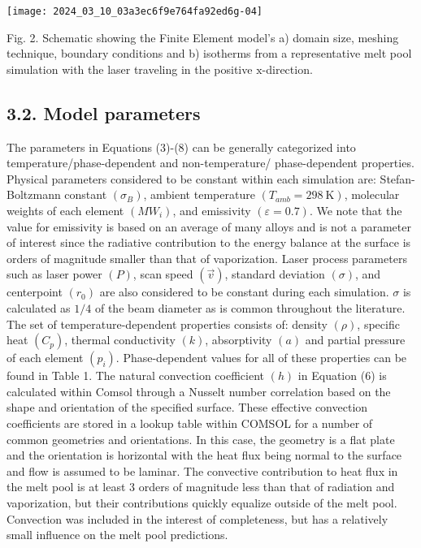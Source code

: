 \documentclass[10pt]{article}
\begin{document}
\begin{center}
\texttt{[image: 2024\_03\_10\_03a3ec6f9e764fa92ed6g-04]}
\end{center}

Fig. 2. Schematic showing the Finite Element model's a) domain size, meshing technique, boundary conditions and b) isotherms from a representative melt pool simulation with the laser traveling in the positive $\mathrm{x}$-direction.

\subsection*{3.2. Model parameters}
The parameters in Equations (3)-(8) can be generally categorized into temperature/phase-dependent and non-temperature/ phase-dependent properties. Physical parameters considered to be constant within each simulation are: Stefan-Boltzmann constant $\left(\sigma_{B}\right)$, ambient temperature $\left(T_{a m b}=298 \mathrm{~K}\right)$, molecular weights of each element $\left(M W_{i}\right)$, and emissivity $(\varepsilon=0.7)$. We note that the value for emissivity is based on an average of many alloys and is not a parameter of interest since the radiative contribution to the energy balance at the surface is orders of magnitude smaller than that of vaporization. Laser process parameters such as laser power $(P)$, scan speed $(\vec{v})$, standard deviation $(\sigma)$, and centerpoint $\left(r_{0}\right)$ are also considered to be constant during each simulation. $\sigma$ is calculated as $1 / 4$ of the beam diameter as is common throughout the literature. The set of temperature-dependent properties consists of: density $(\rho)$, specific heat $\left(C_{p}\right)$, thermal conductivity $(k)$, absorptivity $(a)$ and partial pressure of each element $\left(p_{i}\right)$. Phase-dependent values for all of these properties can be found in Table 1. The natural convection coefficient $(h)$ in Equation (6) is calculated within Comsol through a Nusselt number correlation based on the shape and orientation of the specified surface. These effective convection coefficients are stored in a lookup table within COMSOL for a number of common geometries and orientations. In this case, the geometry is a flat plate and the orientation is horizontal with the heat flux being normal to the surface and flow is assumed to be laminar. The convective contribution to heat flux in the melt pool is at least 3 orders of magnitude less than that of radiation and vaporization, but their contributions quickly equalize outside of the melt pool. Convection was included in the interest of completeness, but has a relatively small influence on the melt pool predictions.
\end{document}
